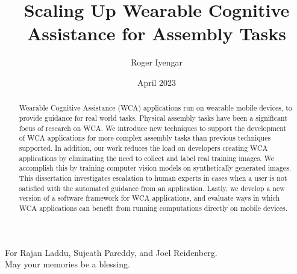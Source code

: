 \documentclass[12pt]{cmuthesis}
\begin{document}
\frontmatter

\title{{\bf Scaling Up Wearable Cognitive Assistance for Assembly Tasks}}
\author{Roger Iyengar}
\date{April 2023}

\vspace{3cm}






\maketitle

\begin{dedication}
  For Rajan Laddu, Sujeath Pareddy, and Joel Reidenberg.\\
  May your memories be a blessing.
\end{dedication}

\begin{abstract}
  Wearable Cognitive Assistance (WCA) applications run on wearable mobile
  devices, to provide guidance for real world tasks.
  Physical assembly tasks have been a significant focus of research on WCA.
  We introduce new techniques to support the development of WCA applications for
  more complex assembly tasks than previous techniques supported.
  In addition, our work reduces the load on developers creating WCA applications
  by eliminating the need to collect and label real training images.
  We accomplish this by training computer vision models on synthetically
  generated images.
  This dissertation investigates escalation to human experts in cases when a
  user is not satisfied with the automated guidance from an application.
  Lastly, we develop a new version of a software framework for WCA
  applications, and evaluate ways in which WCA applications can benefit from
  running computations directly on mobile devices.
\end{abstract}
\end{document}
